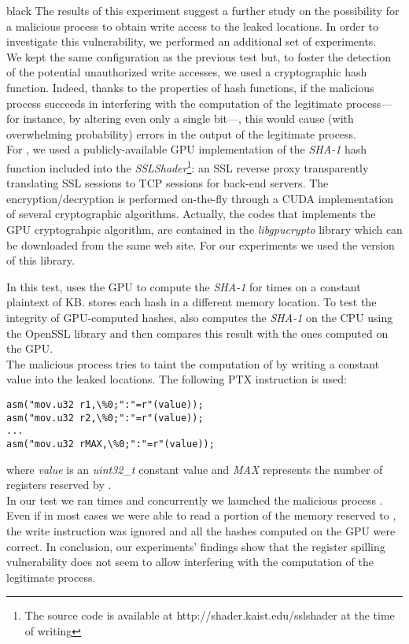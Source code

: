 \documentclass[11pt,onecolumn,letterpaper]{IEEEtran}
\newcommand{\clr}{black}
\begin{document}
\begin{color}{\clr}
\label{writingbug} 
The results of this experiment suggest a further study 
on the possibility for a malicious process to obtain write access to the leaked locations. 
In order to investigate this vulnerability, we performed an additional set of experiments. \\
We kept the same configuration as the previous test but, 
to foster the detection of the potential unauthorized write accesses, we used a cryptographic hash function. 
Indeed, thanks to the properties of hash functions, if the malicious process succeeds in interfering with the computation of the legitimate process---for instance,  
by altering even only a single bit---, this would cause (with overwhelming probability) errors in the output of the legitimate process. \\
For , we used a publicly-available GPU implementation of the \emph{SHA-1} hash function included into the 
\emph{SSLShader}\footnote{The source code is available at http://shader.kaist.edu/sslshader at the time of writing}:
an SSL reverse proxy transparently translating SSL sessions to TCP sessions for back-end servers.  
The encryption/decryption is performed on-the-fly through a CUDA implementation of several cryptographic algorithms. 
Actually, the codes that implements the GPU cryptograhpic algorithm, are contained in the \emph{libgpucrypto} library which can be downloaded from the same web site. 
For our experiments we used the version  of this library. 

In this test,  uses the GPU to compute the \emph{SHA-1} for  times on a constant plaintext of KB. 
 stores each hash in a different memory location. 
To test the integrity of GPU-computed hashes,  also computes the \emph{SHA-1} on the CPU using the OpenSSL library 
and then compares this result with the ones computed on the GPU. \\
The malicious process  tries to taint the computation of  by writing a constant value into the leaked locations. 
The following PTX instruction is used:\\

\begin{Verbatim}[frame=single]
asm("mov.u32 r1,\%0;":"=r"(value));
asm("mov.u32 r2,\%0;":"=r"(value));
...
asm("mov.u32 rMAX,\%0;":"=r"(value));
\end{Verbatim}

where \emph{value} is an \emph{uint32\_t} constant value and \emph{MAX} represents the number of registers reserved by .\\
In our test we ran   times and concurrently we launched the malicious process . 
Even if in most cases we were able to read a portion of the memory reserved to , 
the write instruction was ignored and all the hashes computed on the GPU were correct. 
In conclusion, our experiments' findings show that the register spilling vulnerability does not seem to allow interfering with the computation of the legitimate process.\\  
\end{color}
\end{document}
